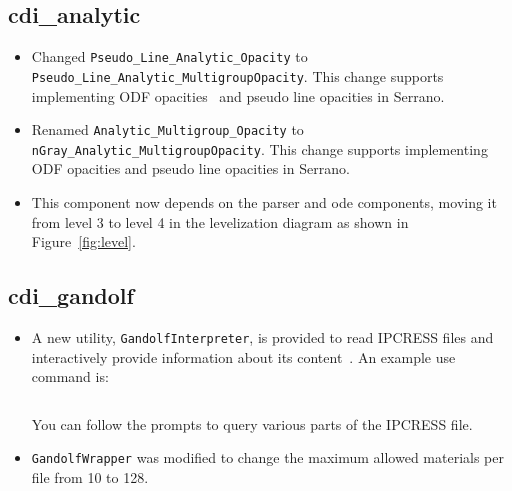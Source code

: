 \documentclass[note]{ResearchNote_pdf}
\begin{document}
\subsection{cdi\_analytic}
\label{changes:cdi-analytic}
\begin{itemize}

\item Changed \texttt{Pseudo\_Line\_Analytic\_Opacity} to
  \texttt{Pseudo\_Line\_Analytic\_MultigroupOpacity}. This change
  supports implementing ODF opacities~\cite{ccs2:08-52} and pseudo
  line opacities in \textsf{Serrano}.

\item Renamed \texttt{Analytic\_Multigroup\_Opacity} to
  \texttt{nGray\_Analytic\_MultigroupOpacity}. This change supports
  implementing ODF opacities and pseudo line opacities in
  \textsf{Serrano}.

\item This component now depends on the \textsf{parser} and
  \textsf{ode} components, moving it from level 3 to level 4 in the
  levelization diagram as shown in Figure~\ref{fig:level}.
\end{itemize}

\subsection{cdi\_gandolf}
\label{changes:cdi-gandolf}
\begin{itemize}

\item A new utility, \texttt{GandolfInterpreter}, is provided to read
  \textsf{IPCRESS} files and interactively provide information about
  its content~\cite{gandolf,tops}.  An example use command is:
%
\begin{lstlisting}[basicstyle=\footnotesize,
    xleftmargin=1.0in, xrightmargin=1.0in]
% ./GandolfInterpreter file.ipcress
\end{lstlisting}
%
You can follow the prompts to query various parts of the IPCRESS file.
\item \texttt{GandolfWrapper} was modified to change the maximum
  allowed materials per file from 10 to 128.
\end{itemize}
\end{document}
